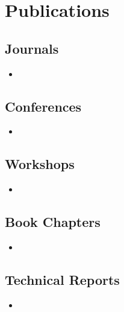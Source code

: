 \chapter*{Publications}

\section*{Journals}

\begin{itemize}
\item {}
\end{itemize}

\section*{Conferences}

\begin{itemize}
\item {}
\end{itemize}

\section*{Workshops}

\begin{itemize}
\item {}
\end{itemize}

\section*{Book Chapters}

\begin{itemize}
\item {}
\end{itemize}

\section*{Technical Reports}
\begin{itemize}
\item {}
\end{itemize}

